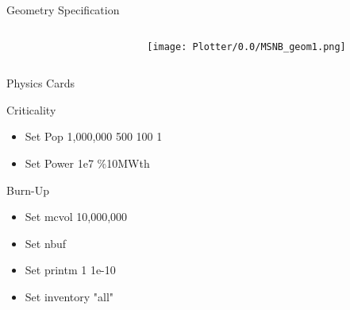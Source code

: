 \documentclass[aspectratio=169,pdftex,dvipsnames]{beamer}
\begin{document}
\begin{frame}{Geometry Specification}
    \begin{columns}
    \begin{column}{0.6\textwidth}
    \begin{figure}
    \end{figure}
    \end{column}
    \begin{column}{0.4\textwidth}
        \begin{figure}[ht!]
            \centering
            \texttt{[image: Plotter/0.0/MSNB\_geom1.png]}
        \end{figure}
    \end{column}
    \end{columns}
\end{frame}

\begin{frame}{Physics Cards}
    \begin{block}{Criticality}
        \begin{itemize}
            \item Set Pop 1,000,000 500 100 1
            \item Set Power 1e7 \%10MWth
        \end{itemize}
    \end{block}
    \begin{block}{Burn-Up}
        \begin{itemize}
            \item Set mcvol 10,000,000
            \item Set nbuf
            \item Set printm 1 1e-10
            \item Set inventory "all"
        \end{itemize}
    \end{block}
\end{frame}
\end{document}
